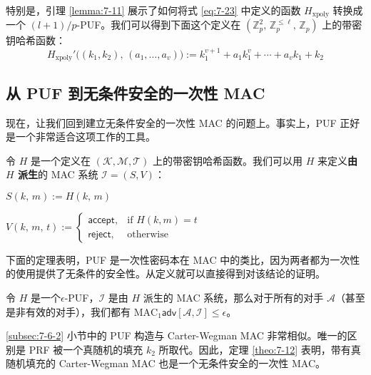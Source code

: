 特别是，引理 \ref{lemma:7-11} 展示了如何将式 \ref{eq:7-23} 中定义的函数 $H_\mathrm{xpoly}$ 转换成一个 $(l+1)/p$-PUF。我们可以得到下面这个定义在 $(\mathbb{Z}_p^2,\,\mathbb{Z}_p^{\leq\ell},\,\mathbb{Z}_p)$ 上的带密钥哈希函数：
\begin{equation}\label{eq:7-33}
H_\mathrm{xpoly}'\big((k_1,k_2),\,(a_1,\dots,a_v)\big):=k_1^{v+1}+a_1k_1^v+\cdots+a_vk_1+k_2
\end{equation}

\subsection{从 PUF 到无条件安全的一次性 MAC}\label{subsec:7-6-3}

现在，让我们回到建立无条件安全的一次性 MAC 的问题上。事实上，PUF 正好是一个非常适合这项工作的工具。

令 $H$ 是一个定义在 $(\mathcal{K},\mathcal{M},\mathcal{T})$ 上的带密钥哈希函数。我们可以用 $H$ 来定义\textbf{由 $H$ 派生}的 MAC 系统 $\mathcal{I}=(S,V)$：

\vspace{5pt}

\hspace*{5pt} $S(k,\,m):=H(k,\,m)$

\vspace{5pt}

\hspace*{5pt} $
V(k,\,m,\,t):=
\left\{
	\begin{array}{ll}
		\mathsf{accept}, & \text{if }H(k,m)=t\\
		\mathsf{reject}, & \text{otherwise}
	\end{array}
\right.
$

\vspace{8pt}

\noindent
下面的定理表明，PUF 是一次性密码本在 MAC 中的类比，因为两者都为一次性的使用提供了无条件的安全性。从定义就可以直接得到对该结论的证明。

\begin{theorem}\label{theo:7-12}
令 $H$ 是一个$\epsilon$-PUF，$\mathcal{I}$ 是由 $H$ 派生的 MAC 系统，那么对于所有的对手 $\mathcal{A}$（甚至是非有效的对手），我们都有 $\mathrm{MAC}_1\mathsf{adv}[\mathcal{A},\mathcal{I}]\leq\epsilon$。
\end{theorem}

\ref{subsec:7-6-2} 小节中的 PUF 构造与 Carter-Wegman MAC 非常相似。唯一的区别是 PRF 被一个真随机的填充 $k_2$ 所取代。因此，定理 \ref{theo:7-12} 表明，带有真随机填充的 Carter-Wegman MAC 也是一个无条件安全的一次性 MAC。
